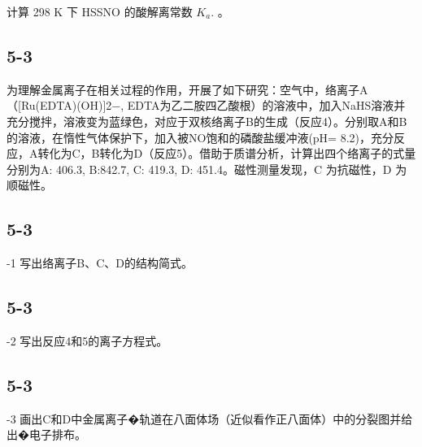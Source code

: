 计算 298 K 下 HSSNO 的酸解离常数 $K _ { a } .$ 。

\subsection*{5-3}
为理解⾦属离⼦在相关过程的作⽤，开展了如下研究：空⽓中，络离⼦A（[Ru(EDTA)(OH)]2−, EDTA为⼄⼆胺四⼄酸根）的溶液中，加⼊NaHS溶液并充分搅拌，溶液变为蓝绿⾊，对应于双核络离⼦B的⽣成（反应4）。分别取A和B的溶液，在惰性⽓体保护下，加⼊被NO饱和的磷酸盐缓冲液(pH= 8.2)，充分反应，A转化为C，B转化为D（反应5）。借助于质谱分析，计算出四个络离⼦的式量分别为A: 406.3, B:842.7, C: 419.3, D: 451.4。磁性测量发现，C 为抗磁性，D 为顺磁性。

\subsection*{5-3}
-1 写出络离⼦B、C、D的结构简式。

\subsection*{5-3}
-2 写出反应4和5的离⼦⽅程式。

\subsection*{5-3}
-3 画出C和D中⾦属离⼦�轨道在⼋⾯体场（近似看作正⼋⾯体）中的分裂图并给出�电⼦排布。
